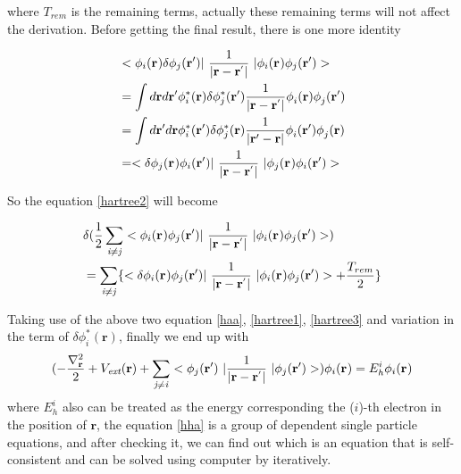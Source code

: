 \documentclass[a4paper, 12pt, titlepage,oneside,drop]{kthesis}
\begin{document}
\noindent where $T_{rem}$ is the remaining terms, actually these remaining terms will not affect the derivation. Before getting the final result, 
there is one more identity 

\begin{equation}\begin{split}\label{hartreelabel1}
& < \bwf<i><> \delta \bwfn<j><'>|\ \frac{1}{|\textbf{r} - \textbf{r}^{'} |} \ | \bwf<i><> \bwfn<j><'>> \\
& = \int d \textbf{r} d \textbf{r}{'}  \phi_{i}^{*} (\textbf{r}{}) \delta \phi_{j}^{*} (\textbf{r}{'}) \frac{1}{|\textbf{r} - \textbf{r}^{'} |}  \phi_{i}^{} (\textbf{r}{})  \phi_{j}^{} (\textbf{r}{'})\\
& = \int d \textbf{r}{'} d \textbf{r}  \phi_{i}^{*} (\textbf{r}{'}) \delta \phi_{j}^{*} (\textbf{r}{}) \frac{1}{|\textbf{r}{'} - \textbf{r} |}  \phi_{i}^{} (\textbf{r}{'})  \phi_{j}^{} (\textbf{r})\\
& = <\delta \bwf<j><> \bwfn<i><'>|\ \frac{1}{|\textbf{r} - \textbf{r}^{'} |} \ | \bwf<j><> \bwfn<i><'>>
\end{split}\end{equation}

\noindent So the equation \ref{hartree2} will become 

\begin{equation}\begin{split}\label{hartree3}
&  \delta( \frac{1}{2} \suminj<i><j> <\bwf<i><> \bwfn<j><'>|\ \frac{1}{|\textbf{r} - \textbf{r}^{'} |} \ | \bwf<i><> \bwfn<j><'>>)   \\
& =  \suminj<i><j> \{  <\delta \bwf<i><> \bwfn<j><'>|\ \frac{1}{|\textbf{r} - \textbf{r}^{'} |} \ | \bwf<i><> \bwfn<j><'>> + \frac{T_{rem}}{2}\}
\end{split}\end{equation}


Taking use of the above two equation \ref{haa}, \ref{hartree1}, \ref{hartree3} and variation in the term of  $\delta \phi^{*}_{i}(\textbf{r}{}) $,
finally we end up with
\begin{equation}\label{hha}
(-\frac{\nabla^{2}_{\textbf r}}{2} + V_\textit{ext}(\textbf{r})+ \suminj<j><i> <\bwfn<j><'>\ | \frac{1}{|\textbf{r} - \textbf{r}^{'} |} \ | \bwfn<j><'>>) \bwf<i><> = E^{i}_{h} \bwf<i><>
\end{equation}
\noindent where $E^{i}_{h}$  also can be treated as the energy corresponding the ($i$)-th electron in the position of  $\textbf{r}$, the equation \ref{hha} is a group of dependent single
 particle equations, and after checking it, we can find out which is an equation that is self-consistent and can be solved using
 computer by iteratively.
\end{document}
